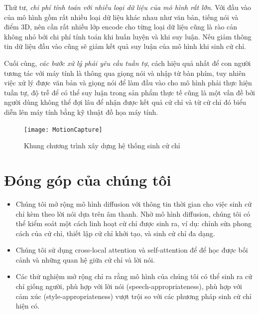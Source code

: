 Thứ tư, \textit{chi phí tính toán với nhiều loại dữ liệu của mô hình rất lớn}. Với đầu vào của mô hình gồm rất nhiều loại dữ liệu khác nhau như văn bản, tiếng nói và điểm 3D, nên cần rất nhiều lớp encode cho từng loại dữ liệu cũng là rào cản không nhỏ bởi chi phí tính toán khi huấn luyện và khi suy luận. Nếu giảm thông tin dữ liệu đầu vào cũng sẽ giảm kết quả suy luận của mô hình khi sinh cử chỉ.

Cuối cùng, \textit{các bước xử lý phải yêu cầu tuần tự}, cách hiệu quả nhất để con người tương tác với máy tính là thông qua giọng nói và nhập từ bàn phím, tuy nhiên việc xử lý được văn bản và giọng nói để làm đầu vào cho mô hình phải thực hiện tuần tự, độ trễ để có thể suy luận trong sản phẩm thực tế cũng là một vấn đề bởi người dùng không thể đợi lâu để nhận được kết quả cử chỉ và từ cử chỉ đó biểu diễn lên máy tính bằng kỹ thuật đồ họa máy tính.

\begin{figure}
	\centering
	\texttt{[image: MotionCapture]}
	\caption{Khung chương trình xây dựng hệ thống sinh cử chỉ}
	\label{fig:MotionCapture}
\end{figure}

\section{Đóng góp của chúng tôi}

\begin{itemize}
\item Chúng tôi mở rộng mô hình diffusion với thông tin thời gian cho việc sinh cử chỉ kèm theo lời nói dựa trên âm thanh. Nhờ mô hình diffusion, chúng tôi có thể kiểm soát một cách linh hoạt cử chỉ được sinh ra, ví dụ: chỉnh sửa phong cách của cử chỉ, thiết lập cử chỉ khởi tạo, và sinh cử chỉ đa dạng.

\item Chúng tôi sử dụng cross-local attention và self-attention để để học được bối cảnh và những quan hệ giữa cử chỉ và lời nói.

\item Các thử nghiệm mở rộng chỉ ra rằng mô hình của chúng tôi có thể sinh ra cử chỉ giống người, phù hợp với lời nói (speech-appropriateness), phù hợp với cảm xúc (style-appropriateness) vượt trội so với các phương pháp sinh cử chỉ hiện có.
\end{itemize}




